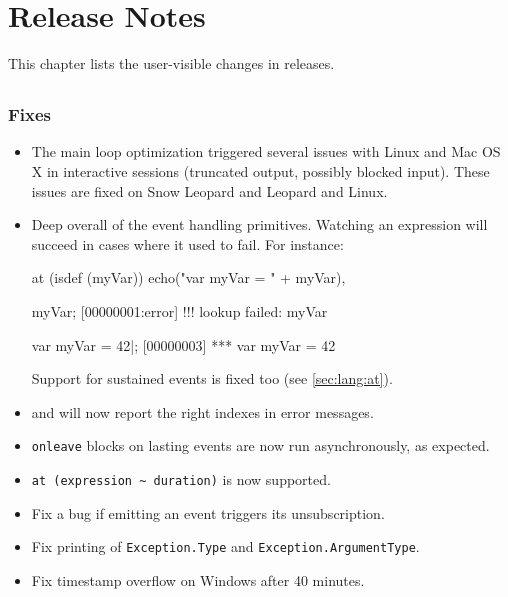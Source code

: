 
\chapter{Release Notes}
\label{sec:news}

This chapter lists the user-visible changes in \usdk releases.

\section{}

\subsection{Fixes}
\begin{itemize}
\item The main loop optimization triggered several issues with Linux and
  Mac OS X in interactive sessions (truncated output, possibly blocked input).
  These issues are fixed on Snow Leopard and Leopard and Linux.
\item Deep overall of the event handling primitives.  Watching an expression
  will succeed in cases where it used to fail.  For instance:

\begin{urbiscript}
at (isdef (myVar))
  echo("var myVar = " + myVar),

myVar;
[00000001:error] !!! lookup failed: myVar

var myVar = 42|;
[00000003] *** var myVar = 42
\end{urbiscript}

  Support for sustained events is fixed too (see \autoref{sec:lang:at}).
\item {} and  will now report the right
  indexes in error messages.
\item \lstinline|onleave| blocks on lasting events are now run
  asynchronously, as expected.
\item \lstinline|at (expression ~ duration)| is now supported.
\item Fix a bug if emitting an event triggers its unsubscription.
\item Fix printing of \lstinline|Exception.Type| and
  \lstinline|Exception.ArgumentType|.
\item Fix timestamp overflow on Windows after 40 minutes.
\end{itemize}


